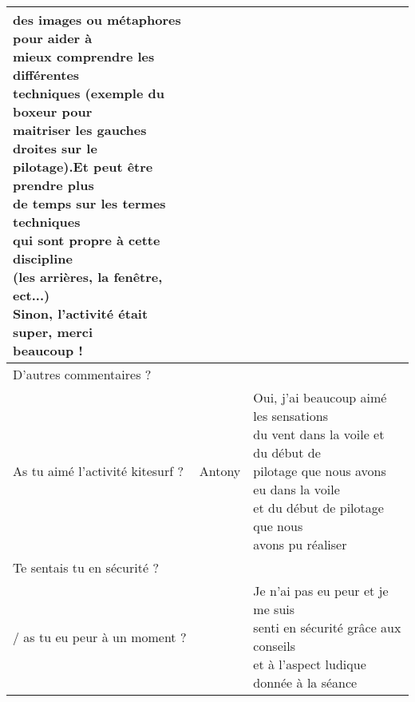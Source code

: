 \documentclass[12pt,a4paper]{report}
\begin{document}
\begin{table}
\begin{tabular}{|p{6cm}|p{1.6cm}|p{7cm}|}
{                                                                        des images ou métaphores pour aider à \\
                                                                        mieux comprendre les différentes \\
                                                                        techniques (exemple du boxeur pour \\
                                                                        maitriser les gauches droites sur le  \\
                                                                        pilotage).Et peut \^etre prendre plus \\
                                                                        de temps sur les termes techniques \\
                                                                        qui sont propre à cette discipline \\
                                                                        (les arrières, la fen\^etre, ect...) \\
                                                                        Sinon, l'activité était super, merci \\
                                                                        beaucoup !}\\
          \hline
          D'autres commentaires ?                       &  &     \\
          \hline                              
       As tu aimé l'activité kitesurf ?      & Antony     & \shortstack{Oui, j'ai beaucoup aimé les sensations\\    du vent  dans la voile et du début de \\ pilotage que nous avons eu dans la voile \\et du début de pilotage que nous \\ avons pu réaliser}\\                                        
       \hline
      Te sentais tu en sécurité ? \\
        / as tu eu peur à un moment ?    &     & \shortstack{Je n'ai pas eu peur et je me suis  \\
                                         senti en sécurité gr\^ace aux conseils\\
                                         et à l'aspect ludique donnée à la séance \\
}
\end{tabular}
\end{table}
\end{document}
